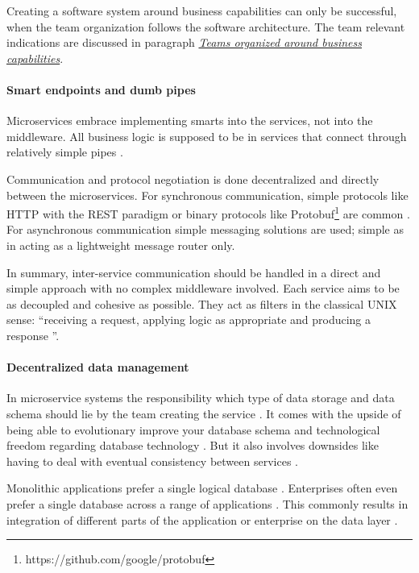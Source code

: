 Creating a software system around business capabilities can only be successful, when the team organization follows the software architecture. The team relevant indications are discussed in paragraph \textit{\hyperref[bac:teamsBusinessCapabilities]{Teams organized around business capabilities}}.

\paragraph{Smart endpoints and dumb pipes}
\label{bac:endpoints}
Microservices embrace implementing smarts into the services, not into the middleware.
All business logic is supposed to be in services that connect through relatively simple pipes \cite{FowlerSmartEndpoints2014}.

Communication and protocol negotiation is done decentralized and directly between the microservices.
For synchronous communication, simple protocols like \ac{HTTP} with the \ac{REST} paradigm or binary protocols like Protobuf\footnote{https://github.com/google/protobuf} are common \citep[p. 182]{Wolff2016}.
For asynchronous communication simple messaging solutions are used;
simple as in acting as a lightweight message router only.
\cite{FowlerSmartEndpoints2014}

In summary, inter-service communication should be handled in a direct and simple approach with no complex middleware involved. Each service aims to be as decoupled and cohesive as possible.
They act as filters in the classical UNIX sense: ``receiving a request, applying logic as appropriate and producing a response \cite{FowlerSmartEndpoints2014}''.

\paragraph{Decentralized data management}
\label{bac:decentralizedDataManagement}
In microservice systems the responsibility which type of data storage and data schema should lie by the team creating the service \citep{FowlerDecentralizedData2014}.
It comes with the upside of being able to evolutionary improve your database schema and technological freedom regarding database technology \citep{FowlerDecentralizedData2014} \cite[p. 187]{Wolff2016}.
But it also involves downsides like having to deal with eventual consistency between services \cite{FowlerDecentralizedData2014}.

Monolithic applications prefer a single logical database \cite{FowlerDecentralizedData2014}.
Enterprises often even prefer a single database across a range of applications \cite{FowlerDecentralizedData2014}.
This commonly results in integration of different parts of the application or enterprise on the data layer \citep[p. 187]{Wolff2016}.

